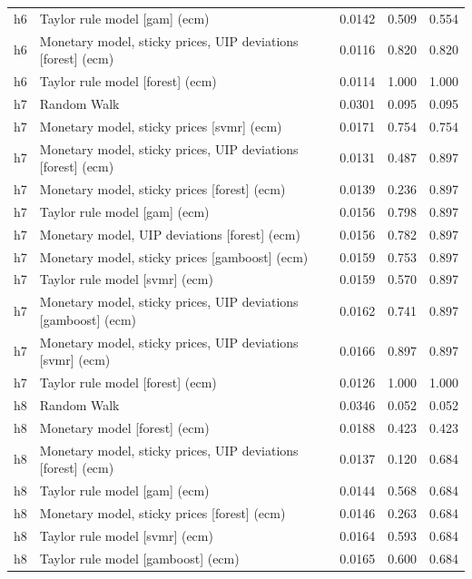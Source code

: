 \begin{ThreePartTable}
\begin{longtable}[t]{cp{5.5cm}ccc}
h6 & \raggedright Taylor rule model [gam] (ecm) & 0.0142 & 0.509 & 0.554\\
h6 & \raggedright Monetary model, sticky prices, UIP deviations [forest] (ecm) & 0.0116 & 0.820 & 0.820\\
h6 & \raggedright Taylor rule model [forest] (ecm) & 0.0114 & 1.000 & 1.000\\
\addlinespace
h7 & \raggedright Random Walk & 0.0301 & 0.095 & 0.095\\
h7 & \raggedright Monetary model, sticky prices [svmr] (ecm) & 0.0171 & 0.754 & 0.754\\
h7 & \raggedright Monetary model, sticky prices, UIP deviations [forest] (ecm) & 0.0131 & 0.487 & 0.897\\
h7 & \raggedright Monetary model, sticky prices [forest] (ecm) & 0.0139 & 0.236 & 0.897\\
h7 & \raggedright Taylor rule model [gam] (ecm) & 0.0156 & 0.798 & 0.897\\
h7 & \raggedright Monetary model, UIP deviations [forest] (ecm) & 0.0156 & 0.782 & 0.897\\
h7 & \raggedright Monetary model, sticky prices [gamboost] (ecm) & 0.0159 & 0.753 & 0.897\\
h7 & \raggedright Taylor rule model [svmr] (ecm) & 0.0159 & 0.570 & 0.897\\
h7 & \raggedright Monetary model, sticky prices, UIP deviations [gamboost] (ecm) & 0.0162 & 0.741 & 0.897\\
h7 & \raggedright Monetary model, sticky prices, UIP deviations [svmr] (ecm) & 0.0166 & 0.897 & 0.897\\
h7 & \raggedright Taylor rule model [forest] (ecm) & 0.0126 & 1.000 & 1.000\\
\addlinespace
h8 & \raggedright Random Walk & 0.0346 & 0.052 & 0.052\\
h8 & \raggedright Monetary model [forest] (ecm) & 0.0188 & 0.423 & 0.423\\
h8 & \raggedright Monetary model, sticky prices, UIP deviations [forest] (ecm) & 0.0137 & 0.120 & 0.684\\
h8 & \raggedright Taylor rule model [gam] (ecm) & 0.0144 & 0.568 & 0.684\\
h8 & \raggedright Monetary model, sticky prices [forest] (ecm) & 0.0146 & 0.263 & 0.684\\
h8 & \raggedright Taylor rule model [svmr] (ecm) & 0.0164 & 0.593 & 0.684\\
h8 & \raggedright Taylor rule model [gamboost] (ecm) & 0.0165 & 0.600 & 0.684\\

\end{longtable}
\end{ThreePartTable}
